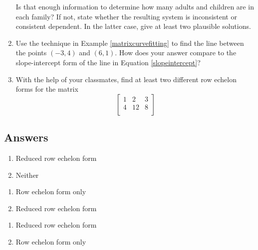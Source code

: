 \documentclass{ximera}
\begin{document}
\begin{enumerate}
\smallskip

Is that enough information to determine how many adults and children are in each family?  If not, state whether the resulting system is inconsistent or consistent dependent.  In the latter case, give at least two plausible solutions.  

\item Use the technique in Example \ref{matrixcurvefitting} to find the line between the points $(-3, 4)$ and $(6, 1)$. How does your answer compare to the slope-intercept form of the line in Equation \ref{slopeintercept}?

\item With the help of your classmates, find at least two different row echelon forms for the matrix \[\left[ \begin{array}{rr|r} 
1 & 2 & 3 \\ 
4 & 12 & 8  \\ 
\end{array} \right]\]

\end{enumerate}

\newpage

\subsection{Answers}

\begin{multicols}{2}
\begin{enumerate}

\item Reduced row echelon form
\item Neither

\setcounter{HW}{\value{enumi}}
\end{enumerate}
\end{multicols}


\begin{multicols}{2}
\begin{enumerate}
\setcounter{enumi}{\value{HW}}



\item Row echelon form only
\item Reduced row echelon form

\setcounter{HW}{\value{enumi}}
\end{enumerate}
\end{multicols}


\begin{multicols}{2}
\begin{enumerate}
\setcounter{enumi}{\value{HW}}

\item Reduced row echelon form
\item Row echelon form only

\setcounter{HW}{\value{enumi}}
\end{enumerate}
\end{multicols}
\end{document}
